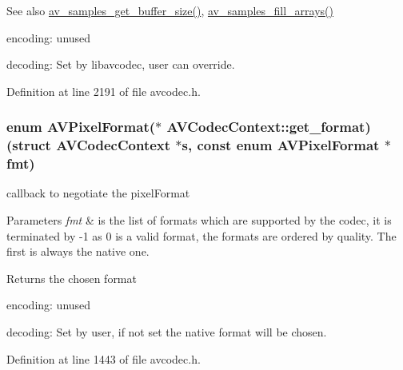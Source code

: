 \begin{DoxySeeAlso}{See also}
\hyperlink{samplefmt_8h_aa7368bc4e3a366b688e81938ed55eb06}{av\+\_\+samples\+\_\+get\+\_\+buffer\+\_\+size()}, \hyperlink{samplefmt_8h_a673254a62fa75dab3211caf17c73c6eb}{av\+\_\+samples\+\_\+fill\+\_\+arrays()}
\end{DoxySeeAlso}

\begin{DoxyItemize}
\item encoding\+: unused
\item decoding\+: Set by libavcodec, user can override. 
\end{DoxyItemize}

Definition at line 2191 of file avcodec.\+h.

\subsubsection[{\texorpdfstring{get\+\_\+format}{get_format}}]{\setlength{\rightskip}{0pt plus 5cm}enum {\bf A\+V\+Pixel\+Format}($\ast$ A\+V\+Codec\+Context\+::get\+\_\+format) (struct {\bf A\+V\+Codec\+Context} $\ast${\bf s}, {\bf const} enum {\bf A\+V\+Pixel\+Format} $\ast$fmt)}\hypertarget{struct_a_v_codec_context_a360a2b8508a67c4234d97f4c13ba1bb5}{}\label{struct_a_v_codec_context_a360a2b8508a67c4234d97f4c13ba1bb5}
callback to negotiate the pixel\+Format 
\begin{DoxyParams}{Parameters}
{\em fmt} & is the list of formats which are supported by the codec, it is terminated by -\/1 as 0 is a valid format, the formats are ordered by quality. The first is always the native one. \\
\hline
\end{DoxyParams}
\begin{DoxyReturn}{Returns}
the chosen format
\begin{DoxyItemize}
\item encoding\+: unused
\item decoding\+: Set by user, if not set the native format will be chosen. 
\end{DoxyItemize}
\end{DoxyReturn}


Definition at line 1443 of file avcodec.\+h.

